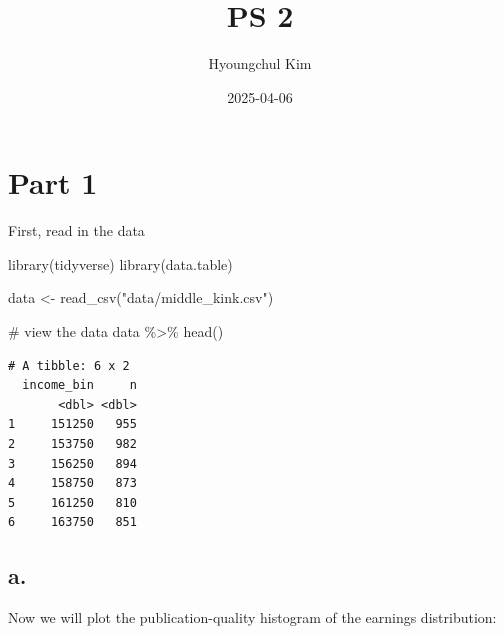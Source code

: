 \documentclass[
  letterpaper,
  DIV=11,
  numbers=noendperiod]{scrartcl}
\title{PS 2}
\author{Hyoungchul Kim}
\date{2025-04-06}
\newenvironment{Shaded}{\begin{snugshade}}{\end{snugshade}}
\newcommand{\CommentTok}[1]{\textcolor[rgb]{0.37,0.37,0.37}{#1}}
\newcommand{\FunctionTok}[1]{\textcolor[rgb]{0.28,0.35,0.67}{#1}}
\newcommand{\NormalTok}[1]{\textcolor[rgb]{0.00,0.23,0.31}{#1}}
\newcommand{\OtherTok}[1]{\textcolor[rgb]{0.00,0.23,0.31}{#1}}
\newcommand{\SpecialCharTok}[1]{\textcolor[rgb]{0.37,0.37,0.37}{#1}}
\newcommand{\StringTok}[1]{\textcolor[rgb]{0.13,0.47,0.30}{#1}}
\begin{document}
\maketitle


\section{Part 1}\label{part-1}

First, read in the data

\begin{Shaded}
\begin{Highlighting}[]
\FunctionTok{library}\NormalTok{(tidyverse)}
\FunctionTok{library}\NormalTok{(data.table)}

\NormalTok{data }\OtherTok{\textless{}{-}} \FunctionTok{read\_csv}\NormalTok{(}\StringTok{"data/middle\_kink.csv"}\NormalTok{)}

\CommentTok{\# view the data}
\NormalTok{data }\SpecialCharTok{\%\textgreater{}\%} \FunctionTok{head}\NormalTok{()}
\end{Highlighting}
\end{Shaded}

\begin{verbatim}
# A tibble: 6 x 2
  income_bin     n
       <dbl> <dbl>
1     151250   955
2     153750   982
3     156250   894
4     158750   873
5     161250   810
6     163750   851
\end{verbatim}

\subsection{a.}\label{a.}

Now we will plot the publication-quality histogram of the earnings
distribution:
\end{document}
